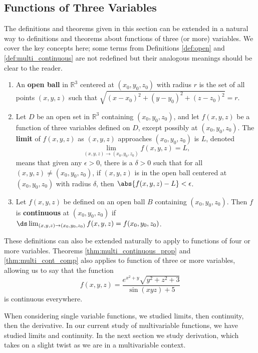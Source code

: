 \subsection{Functions of Three Variables}

The definitions and theorems given in this section can be extended in a natural way to definitions and theorems about functions of three (or more) variables. We cover the key concepts here; some terms from Definitions \ref{def:open} and \ref{def:multi_continuous} are not redefined but their analogous meanings should be clear to the reader.

{
\begin{definition}\label{def:multi3defs}
%
\begin{enumerate}
\item An \textbf{open ball} in $\mathbb{R}^3$ centered at $(x_0,y_0,z_0)$ with radius $r$ is the set of all points $(x,y,z)$ such that $\sqrt{(x-x_0)^2+(y-y_0)^2+(z-z_0)^2} = r$.\bigskip
\item Let $D$ be an open set in $\mathbb{R}^3$ containing $(x_0,y_0,z_0)$, and let $f(x,y,z)$ be a function of three variables defined on $D$, except possibly at  $(x_0,y_0,z_0)$. The \textbf{limit} of $f(x,y,z)$ as $(x,y,z)$ approaches $(x_0,y_0,z_0)$ is $L$, denoted 
\[\lim_{(x,y,z)\to (x_0,y_0,z_0)} f(x,y,z) = L,\]
means that given any $\epsilon >0$, there is a $\delta >0$ such that for all  $(x,y,z)\neq(x_0,y_0,z_0)$, if $(x,y,z)$ is in the open ball centered at $(x_0,y_0,z_0)$ with radius $\delta$, then $\abs{f(x,y,z) - L}< \epsilon$.\bigskip
\item Let $f(x,y,z)$ be defined on an open ball $B$ containing $(x_0,y_0,z_0)$. Then $f$ is \textbf{continuous} at $(x_0,y_0,z_0)$ if $\ds \lim_{(x,y,z)\to (x_0,y_0,z_0)} f(x,y,z) = f(x_0,y_0,z_0)$.
\end{enumerate}
\end{definition}
}

These definitions can also be extended naturally to apply to functions of four or more variables. Theorems \ref{thm:multi_continuous_prop} and \ref{thm:multi_cont_comp} also applies to function of three or more variables, allowing us to say that the function
\[f(x,y,z) = \frac{e^{x^2+y}\sqrt{y^2+z^2+3}}{\sin (xyz)+5}\]
is continuous everywhere.

When considering single variable functions, we studied limits, then continuity, then the derivative. In our current study of multivariable functions, we have studied limits and continuity. In the next section we study derivation, which takes on a slight twist as we are in a multivariable context.

